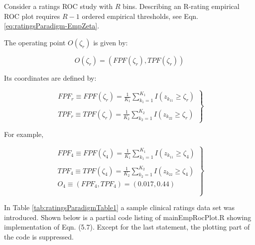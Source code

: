 \documentclass[
]{book}
\begin{document}
Consider a ratings ROC study with \(R\) bins. Describing an R-rating empirical ROC plot requires \(R-1\) ordered empirical thresholds, see Eqn. \eqref{eq:ratingsParadigm-EmpZeta}.

The operating point \(O(\zeta_r)\) is given by:

\begin{equation}
O\left ( \zeta_r \right ) = \left ( FPF\left ( \zeta_r \right ), TPF\left ( \zeta_r \right ) \right )
\label{eq:empirical-OperatingPointZetar}
\end{equation}

Its coordinates are defined by:

\begin{equation} 
\left.
\begin{aligned}
FPF_r \equiv FPF\left ( \zeta_r \right )=\frac {1} {K_1} \sum_{k_1=1}^{K_1}I \left ( z_{k_11} \geq  \zeta_r\right ) \\
\\
TPF_r \equiv TPF\left ( \zeta_r \right )=\frac {1} {K_2} \sum_{k_2=1}^{K_2} I\left ( z_{k_22} \geq  \zeta_r\right )
\end{aligned}
\right \}
\label{eq:empirical-OperatingPointFPF-TPF-r}
\end{equation}

For example,

\begin{equation} 
\left.
\begin{aligned}
FPF_4 \equiv FPF\left ( \zeta_4 \right )=\frac {1} {K_1} \sum_{k_1=1}^{K_1}I \left ( z_{k_11} \geq  \zeta_4\right ) \\
\\
TPF_4 \equiv TPF\left ( \zeta_4 \right )=\frac {1} {K_2} \sum_{k_2=1}^{K_2} I\left ( z_{k_22} \geq  \zeta_4\right )
\\
O_4 \equiv \left ( FPF_4, TPF_4 \right ) = \left ( 0.017, 0.44 \right )\\
\\
\end{aligned}
\right \}
\label{eq:empirical-OperatingPointFPF-TPF-4}
\end{equation}

In Table \ref{tab:ratingsParadigmTable1} a sample clinical ratings data set was introduced. Shown below is a partial code listing of mainEmpRocPlot.R showing implementation of Eqn. (5.7). Except for the last statement, the plotting part of the code is suppressed.
\end{document}
